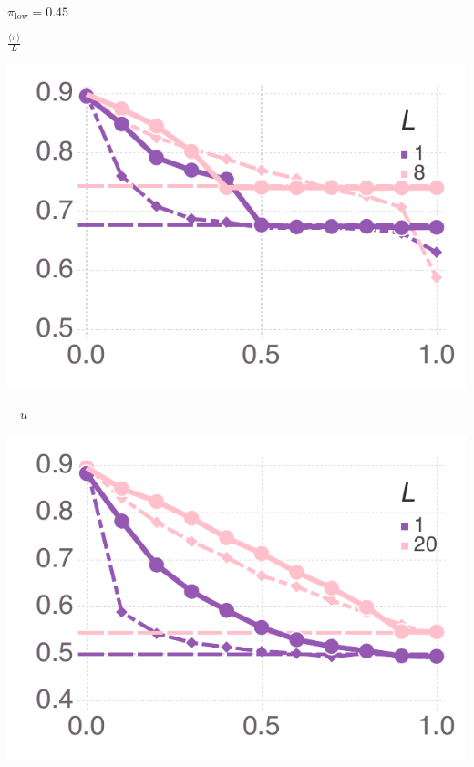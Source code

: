 \documentclass[varwidth=true,crop=false]{standalone}
\newcommand{\pisub}[1]{\pi_{\mathrm{#1}}}
\newcommand{\pilow}{\pisub{low}}
\newcommand{\meanvar}[1]{\langle #1 \rangle}
\newcommand{\meanpi}{\meanvar{\pi}}
\begin{document}
\begin{minipage}{3.75in}
    \end{minipage}~\\[0.5em]

    \begin{minipage}{3.75in}
    \begin{rotate}{90}
      {\parbox{2.5in}{
          \centering
          \vspace{-2.5em} {\huge$ \pilow = 0.45$} \\
          {\begin{rotate}{-90}{\huge $\frac{\meanpi}{L}$}\hspace{3em}\end{rotate}}
      }}
    \end{rotate}%
    \hspace{2em}
      \includegraphics[width=\textwidth]{Figures/mean_prev_net_payoff_over_u_lowpayoff=0.45_nbehaviors=2.pdf}
        \\[-2.75em]
        \begin{center}
          {\hspace{3.25em} \huge $\quad u$}
      \end{center}
        \end{minipage}\noindent\begin{minipage}{3.75in}%
      \includegraphics[width=\textwidth]{Figures/mean_prev_net_payoff_over_u_lowpayoff=0.45_nbehaviors=10.pdf}

\end{minipage}
\end{document}
